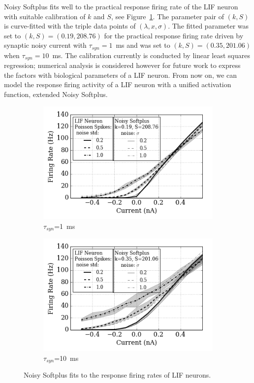 \documentclass{article}
\begin{document}
Noisy Softplus fits well to the practical response firing rate of the LIF neuron with suitable calibration of $k$ and $S$, see Figure~\ref{Fig:nsptau1}.
The parameter pair of $(k, S)$ is curve-fitted with the triple data points of $(\lambda, x, \sigma)$.
The fitted parameter was set to $(k, S)=(0.19,208.76)$ for the practical response firing rate driven by synaptic noisy current with $\tau_{syn}=1$~ms and was set to $(k, S)=(0.35,201.06)$ when $\tau_{syn}=10$~ms.
The calibration currently is conducted by linear least squares regression; numerical analysis is considered however for future work to express the factors with biological parameters of a LIF neuron. From now on, we can model the response firing activity of a LIF neuron with a unified activation function, extended Noisy Softplus.

\begin{figure}
	\centering
	\begin{subfigure}[htb]{0.49\textwidth}
		\includegraphics[width=\textwidth]{pics_iconip/4-1.png}
		\caption{$\tau_{syn}$=1~ms}
	\end{subfigure}
	\begin{subfigure}[htb]{0.49\textwidth}
		\includegraphics[width=\textwidth]{pics_iconip/4-10.png}
		\caption{$\tau_{syn}$=10~ms}
	\end{subfigure}
	\caption{Noisy Softplus fits to the response firing rates of LIF neurons.}
	\label{Fig:nsptau1}
\end{figure}		
\end{document}
